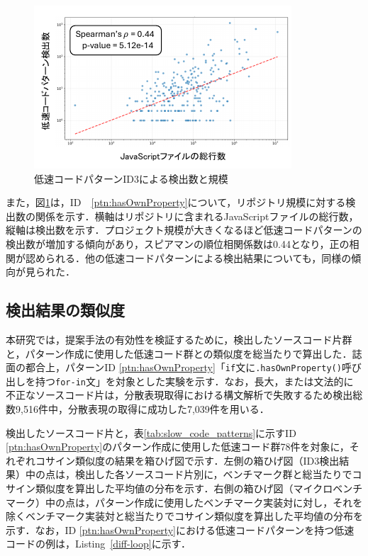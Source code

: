 \documentclass[submit,techrep,noauthor]{ipsj}
\begin{document}
\begin{figure}[t]
    \centering
    \includegraphics[width=1.0\linewidth]{./Noguchi_fig/log_ID3_spia.pdf}
    \caption{低速コードパターンID3による検出数と規模}
    \label{fig:plot_id3}
\end{figure}

また，図\ref{fig:plot_id3}は，ID~~\ref{ptn:hasOwnProperty}について，リポジトリ規模に対する検出数の関係を示す．横軸はリポジトリに含まれるJavaScriptファイルの総行数，縦軸は検出数を示す．プロジェクト規模が大きくなるほど低速コードパターンの検出数が増加する傾向があり，スピアマンの順位相関係数は0.44となり，正の相関が認められる．他の低速コードパターンによる検出結果についても，同様の傾向が見られた．

\subsection{検出結果の類似度}

本研究では，提案手法の有効性を検証するために，検出したソースコード片群と，パターン作成に使用した低速コード群との類似度を総当たりで算出した．誌面の都合上，パターンID \ref{ptn:hasOwnProperty}「\texttt{if}文に\texttt{.hasOwnProperty()}呼び出しを持つ\texttt{for-in}文」を対象とした実験を示す．なお，長大，または文法的に不正なソースコード片は，分散表現取得における構文解析で失敗するため検出総数9,516件中，分散表現の取得に成功した7,039件を用いる．


検出したソースコード片と，表\ref{tab:slow_code_patterns}に示すID \ref{ptn:hasOwnProperty}のパターン作成に使用した低速コード群78件を対象に，それぞれコサイン類似度の結果を箱ひげ図で示す．左側の箱ひげ図（ID3検出結果）中の点は，検出した各ソースコード片別に，ベンチマーク群と総当たりでコサイン類似度を算出した平均値の分布を示す．右側の箱ひげ図（マイクロベンチマーク）中の点は，パターン作成に使用したベンチマーク実装対に対し，それを除くベンチマーク実装対と総当たりでコサイン類似度を算出した平均値の分布を示す．なお，ID \ref{ptn:hasOwnProperty}における低速コードパターンを持つ低速コードの例は，Listing~\ref{diff-loop}に示す．
\end{document}
